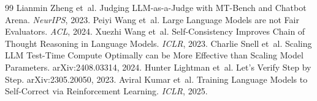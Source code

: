 \begin{thebibliography}{99}
 Lianmin Zheng et~al. Judging LLM-as-a-Judge with MT-Bench and Chatbot Arena. \emph{NeurIPS}, 2023.
 Peiyi Wang et~al. Large Language Models are not Fair Evaluators. \emph{ACL}, 2024.
 Xuezhi Wang et~al. Self-Consistency Improves Chain of Thought Reasoning in Language Models. \emph{ICLR}, 2023.
 Charlie Snell et~al. Scaling LLM Test-Time Compute Optimally can be More Effective than Scaling Model Parameters. arXiv:2408.03314, 2024.
 Hunter Lightman et~al. Let's Verify Step by Step. arXiv:2305.20050, 2023.
 Aviral Kumar et~al. Training Language Models to Self-Correct via Reinforcement Learning. \emph{ICLR}, 2025.
\end{thebibliography}

